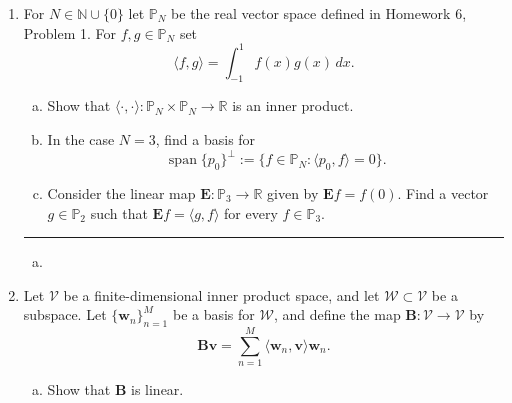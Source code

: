 \documentclass[12pt]{amsart}
\newcommand{\1}{\mathbbm{1}}
\numberwithin{equation}{section}
\numberwithin{Theorem}{section}
\theoremstyle{plain} %
\theoremstyle{definition}
\theoremstyle{remark}
\begin{document}
\thispagestyle{empty}

\bigskip


\begin{enumerate}[1.]

\item For \(N\in\mathbb{N}\cup\{0\}\) let \(\mathbb{P}_{N}\) be the real vector space defined in Homework 6, Problem 1. For \(f,g\in\mathbb{P}_{N}\) set
\[\langle f,g\rangle = \int_{-1}^{1}f(x)g(x)\,dx.\]

\begin{enumerate}[(a)]
\item Show that \(\langle\cdot,\cdot\rangle:\mathbb{P}_{N}\times\mathbb{P}_{N}\to\mathbb{R}\) is an inner product.\medskip

\item In the case \(N=3\), find a basis for 
\[\operatorname{span}\{p_{0}\}^{\bot}:=\{f\in\mathbb{P}_{N} : \langle p_{0},f\rangle = 0\}.\]

\item Consider the linear map \(\mathbf{E}:\mathbb{P}_{3}\to\mathbb{R}\) given by \(\mathbf{E}f = f(0)\). Find a vector \(g\in\mathbb{P}_{2}\) such that \(\mathbf{E}f = \langle g,f\rangle\) for every \(f\in\mathbb{P}_{3}\).

\end{enumerate}\bigskip

\hrule
\bigskip
\begin{enumerate}[(a)]
	\item
	

\end{enumerate}

\clearpage

\item Let \(\mathcal{V}\) be a finite-dimensional inner product space, and let \(\mathcal{W}\subset \mathcal{V}\) be a subspace. Let \(\{\mathbf{w}_{n}\}_{n=1}^{M}\) be a basis for \(\mathcal{W}\), and define the map \(\mathbf{B}:\mathcal{V}\to\mathcal{V}\) by
\[\mathbf{B}\mathbf{v} = \sum_{n=1}^{M}\langle \mathbf{w}_{n},\mathbf{v}\rangle \mathbf{w}_{n}.\]\medskip

\begin{enumerate}[(a)]

\item Show that \(\mathbf{B}\) is linear.\medskip


\end{enumerate}
\end{enumerate}
\end{document}
